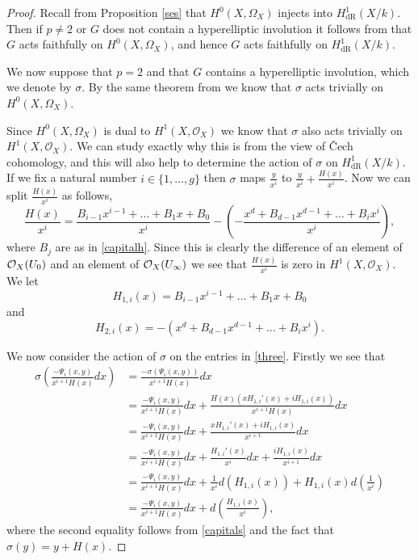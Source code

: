 \documentclass[draft, 11pt]{article} %
\theoremstyle{plain}
\theoremstyle{remark}
\newcommand{\cO}{{\cal O}}
\newcommand{\cech}{\v{C}ech }
\newcommand{\hzero}{{H^0(X,\Omega_X)}}
\newcommand{\hone}{H^1(X,\mathcal{O}_X)}
\newcommand{\derhamhone}{H_{\text {dR}}^1(X/k)}
\begin{document}
\begin{proof}
Recall from Proposition \ref{ses} that $H^0(X,\Omega_X)$ injects into $\derhamhone$.
Then if $p \neq 2$ or $G$ does not contain a hyperelliptic involution it follows from \cite[Thm. 4.2]{faithfulaction} that $G$ acts faithfully on $H^0(X,\Omega_X)$, and hence $G$ acts faithfully on $\derhamhone$.

We now suppose that $p=2$ and that $G$ contains a hyperelliptic involution, which we denote by $\sigma$.
By the same theorem from \cite{faithfulaction} we know that $\sigma$ acts trivially on $\hzero$.

Since $\hzero$ is dual to $\hone$ we know that $\sigma$ also acts trivially on $\hone$.
We can study exactly why this is from the view of \cech cohomology, and this will also help to determine the action of $\sigma$ on $\derhamhone$.
If we fix a natural number $i\in \{1, \ldots ,g\}$ then $\sigma$ maps $\frac{y}{x^i}$ to $\frac{y}{x^i} + \frac{H(x)}{x^i}$. 
Now we can split $\frac{H(x)}{x^i}$ as follows, 
\begin{equation*}
\frac{H(x)}{x^i} =  \frac{B_{i-1}x^{i-1} + \ldots + B_1x + B_0}{x^i} - \left( - \frac{x^d + B_{d-1}x^{d-1} + \ldots + B_ix^i}{x^i} \right),
\end{equation*}
where $B_j$ are as in \eqref{capitalh}.
Since this is clearly the difference of an element of $\cO_X(U_0)$ and an element of $\cO_X(U_\infty)$ we see that $\frac{H(x)}{x^i}$ is zero in $\hone$.
We let 
\[
H_{1,i}(x) = B_{i-1}x^{i-1} + \ldots + B_1x + B_0
\]
and 
\[
H_{2,i}(x) = -( x^d + B_{d-1}x^{d-1} + \ldots + B_ix^i).
\]

We now consider the action of $\sigma$ on the entries in \eqref{three}.
Firstly we see that
\begin{align*}
\sigma \left( \frac{-\Psi_i(x,y)}{x^{i+1}H(x)} dx\right) & = \frac{-\sigma(\Psi_i(x,y))}{x^{i+1} H(x)} dx \\
& = \frac{-\Psi_i(x,y)}{x^{i+1}H(x)}dx + \frac{H(x)(xH_{1,i}'(x) + iH_{1,i}(x))}{x^{i+1}H(x)}dx\\
& = \frac{-\Psi_i(x,y)}{x^{i+1}H(x)}dx + \frac{xH_{1,i}'(x) + iH_{1,i}(x)}{x^{i+1}}dx \\
& = \frac{-\Psi_i(x,y)}{x^{i+1}H(x)}dx +  \frac{H_{1,i}'(x)}{x^i}dx + \frac{iH_{1,i}(x)}{x^{i+1}}dx \\
& = \frac{-\Psi_i(x,y)}{x^{i+1}H(x)}dx +  \frac{1}{x^i}d\left( H_{1,i}(x) \right) + H_{1,i}(x) d \left( \frac{1}{x^i} \right) \\
& = \frac{-\Psi_i(x,y)}{x^{i+1}H(x)}dx + d\left( \frac{H_{1,i}(x)}{x^i} \right),
\end{align*}
where the second equality follows from \eqref{capitals} and the fact that $\sigma(y) = y + H(x)$.


\end{proof}
\end{document}
